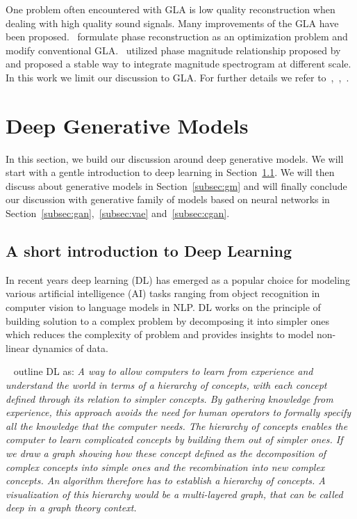 One problem often encountered with GLA is low quality reconstruction when dealing with high quality sound signals. Many improvements of the GLA have been proposed.~\cite{perraudin2013fast} formulate phase reconstruction as an optimization problem and modify conventional GLA.~\cite{pruuvsa2017noniterative} utilized phase magnitude relationship proposed by~\cite{auger2012phase} and proposed a stable way to integrate magnitude spectrogram at different scale. In this work we limit our discussion to GLA. For further details we refer to~\cite{perraudin2013fast},~\cite{le2010fast},~\cite{jaganathan2015phase}.
\section{Deep Generative Models}
\label{sec:dgm}
In this section, we build our discussion around deep generative models. We will start with a gentle introduction to deep learning in Section~\ref{subsec:dl}. We will then discuss about generative models in Section~\ref{subsec:gm} and will finally conclude our discussion with generative family of models based on neural networks in Section~\ref{subsec:gan},~\ref{subsec:vae} and~\ref{subsec:cgan}. 
\subsection{A short introduction to Deep Learning}
\label{subsec:dl}
In recent years deep learning (DL) has emerged as a popular choice for modeling various artificial intelligence (AI) tasks ranging from object recognition in computer vision to language models in NLP. DL works on the principle of building solution to a complex problem by decomposing it into simpler ones which reduces the complexity of problem and provides insights to model non-linear dynamics of data. 

~\cite{Goodfellow-et-al-2016} outline DL as:
\emph{A way to allow computers to learn from experience and understand the world in terms of a hierarchy of concepts, with each concept deﬁned through its relation to simpler concepts. By gathering knowledge from experience, this approach avoids the need for human operators to formally specify all the knowledge that the computer needs. The hierarchy of concepts enables the computer to learn complicated concepts by building them out of simpler ones. If we draw a graph showing how these concept defined as the decomposition of complex concepts into simple ones and the recombination into new complex concepts. An algorithm therefore has to establish a hierarchy of concepts. A visualization of this hierarchy would be a multi-layered graph, that can be called deep in a graph theory context.}

